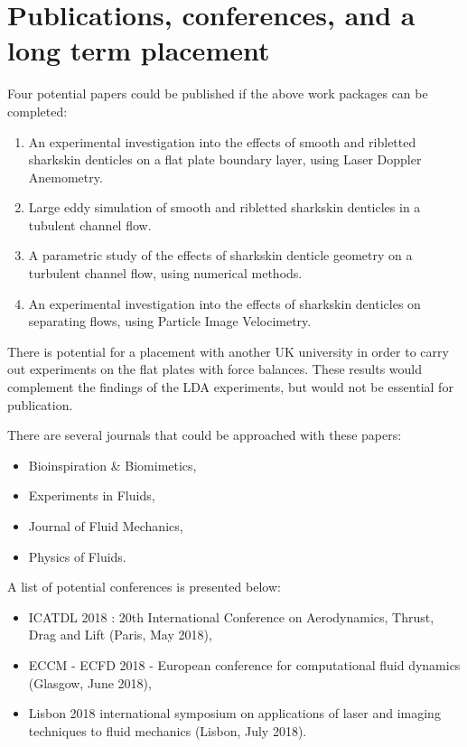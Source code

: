 \documentclass[12pt,oneside,a4paper]{article}
\begin{document}
\section{Publications, conferences, and a long term placement}
Four potential papers could be published if the above work packages can be completed:
\begin{enumerate}
\itemsep0em

\item An experimental investigation into the effects of smooth and ribletted sharkskin denticles on a flat plate boundary layer, using Laser Doppler Anemometry.

\item Large eddy simulation of smooth and ribletted sharkskin denticles in a tubulent channel flow.

\item A parametric study of the effects of sharkskin denticle geometry on a turbulent channel flow, using numerical methods. 

\item An experimental investigation into the effects of sharkskin denticles on separating flows, using Particle Image Velocimetry. 
\end{enumerate}
There is potential for a placement with another UK university in order to carry out experiments on the flat plates with force balances. These results would complement the findings of the LDA experiments, but would not be essential for publication. 

There are several journals that could be approached with these papers:
\begin{itemize}
\itemsep0em
\item Bioinspiration \& Biomimetics,
\item Experiments in Fluids,
\item Journal of Fluid Mechanics,
\item Physics of Fluids.
\end{itemize}
A list of potential conferences is presented below:
\begin{itemize}
\itemsep0em
\item ICATDL 2018 : 20th International Conference on Aerodynamics, Thrust, Drag and Lift (Paris, May 2018),
\item ECCM - ECFD 2018 - European conference for computational fluid dynamics (Glasgow, June 2018),
\item Lisbon 2018 international symposium on applications of laser and imaging techniques to fluid mechanics (Lisbon, July 2018).
\end{itemize}


\newpage

\end{document}
